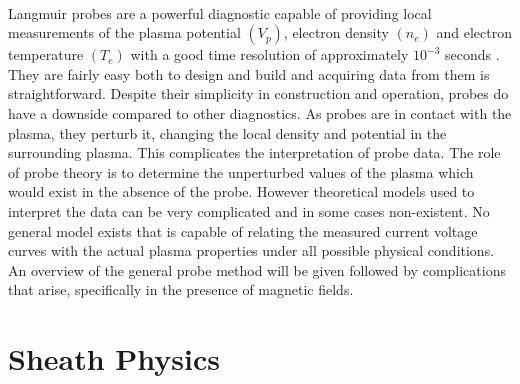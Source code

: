 \paragraph{}
Langmuir probes are a powerful diagnostic capable of providing local measurements of the plasma potential $(V_{p})$, electron density $(n_e)$ and electron temperature $(T_e)$ with a good time resolution of approximately $10^{-3}$ seconds \cite{probetheoryandpractise}. They are fairly easy both to design and build and acquiring data from them is straightforward. Despite their simplicity in construction and operation, probes do have a downside compared to other diagnostics. As probes are in contact with the plasma, they perturb it, changing the local density and potential in the surrounding plasma. This complicates the interpretation of probe data. The role of probe theory is to determine the unperturbed values of the plasma which would exist in the absence of the probe. However theoretical models used to interpret the data can be very complicated and in some cases non-existent. No general model exists that is capable of relating the measured current voltage curves with the actual plasma properties under all possible physical conditions. An overview of the general probe method will be given followed by complications that arise, specifically in the presence of magnetic fields. 



\section{Sheath Physics}
 

